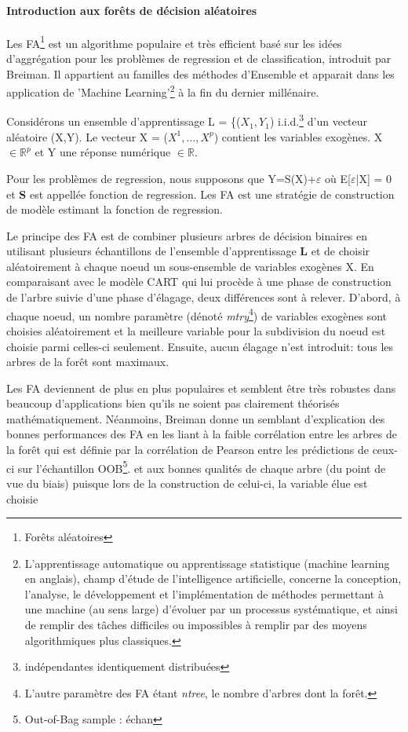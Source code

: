 	\paragraph{Introduction aux forêts de décision aléatoires\newline}
	Les FA\footnote{Forêts aléatoires} est un algorithme populaire et très efficient basé sur les idées d'aggrégation pour les problèmes de regression et de classification, introduit par Breiman\cite{BREI01}. Il appartient au familles des méthodes d'Ensemble et apparait dans les application de 'Machine Learning'\footnote{L'apprentissage automatique ou apprentissage statistique (machine learning en anglais), champ d'étude de l'intelligence artificielle, concerne la conception, l'analyse, le développement et l'implémentation de méthodes permettant à une machine (au sens large) d'évoluer par un processus systématique, et ainsi de remplir des tâches difficiles ou impossibles à remplir par des moyens algorithmiques plus classiques.} à la fin du dernier millénaire\cite{DITRI99}.
	\par
	\newcommand{\reels}{\mathbb{R}}
	Considérons un ensemble d'apprentissage L = \{($X_1, Y_1$) i.i.d.\footnote{indépendantes identiquement distribuées} d'un vecteur aléatoire (X,Y). Le vecteur X = ($X^1,...,X^p$) contient les variables exogènes. X $\in \reels^p $ et Y une réponse numérique $\in \reels $.
	\par
	Pour les problèmes de regression, nous supposons que Y=S(X)+$\varepsilon$ où E[$\varepsilon$|X] = 0 et \textbf{S} est appellée fonction de regression. Les FA est une stratégie de construction de modèle estimant la fonction de regression.
	\par
	Le principe des FA est de combiner plusieurs arbres de décision binaires en utilisant plusieurs échantillons de l'ensemble d'apprentissage \textbf{L} et de choisir aléatoirement à chaque noeud un sous-ensemble de variables exogènes X. En comparaisant avec le modèle CART\cite{BREI84} qui lui procède à une phase de construction de l'arbre suivie d'une phase d'élagage, deux différences sont à relever. D'abord, à chaque noeud, un nombre paramètre (dénoté \textit{mtry}\footnote{L'autre paramètre des FA étant \textit{ntree}, le nombre d'arbres dont la forêt.}) de variables exogènes sont choisies aléatoirement et la meilleure variable pour la subdivision du noeud est choisie parmi celles-ci seulement. Ensuite, aucun élagage n'est introduit: tous les arbres de la forêt sont maximaux.\par
	Les FA deviennent de plus en plus populaires et semblent être très robustes dans beaucoup d'applications bien qu'ils ne soient pas clairement théorisés mathématiquement\cite{BIA08}. Néanmoins, Breiman\cite{BREI01} donne un semblant d'explication des bonnes performances des FA en les liant à la faible corrélation entre les arbres de la forêt qui est définie par la corrélation de Pearson entre les prédictions de ceux-ci sur l'échantillon OOB\footnote{Out-of-Bag sample : échan }. et aux bonnes qualités de chaque arbre (du point de vue du biais) puisque lors de la construction de celui-ci, la variable élue est choisie
	

